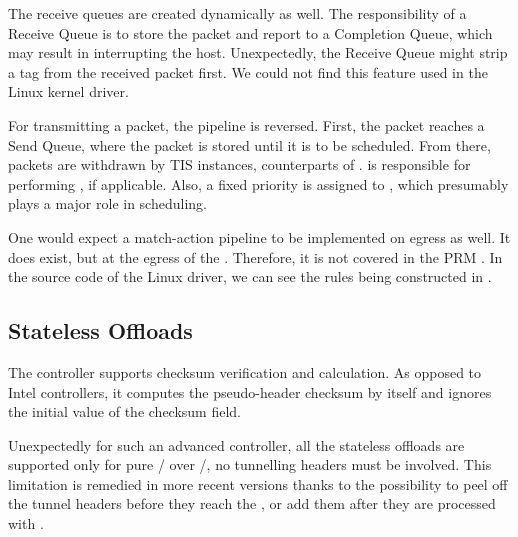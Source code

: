 The receive queues are created dynamically as well. The responsibility of a Receive
Queue is to store the packet and report to a Completion Queue, which may result
in interrupting the host. Unexpectedly, the Receive Queue might strip
a  tag from the received packet first. We could not find this
feature used in the Linux kernel driver.

For transmitting a packet, the pipeline is reversed. First, the packet reaches
a Send Queue, where the packet is stored until it is to be scheduled. From
there, packets are withdrawn by \acrfull{TIS} instances, counterparts of
.  is responsible for performing , if applicable. Also,
a fixed priority is assigned to , which presumably plays a major role in
scheduling.

One would expect a match-action pipeline to be implemented on egress as well.
It does exist, but at the egress of the . Therefore, it is not
covered in the PRM \cite{mlx-prm}. In the source code of the Linux driver, we
can see the rules being constructed in
.

\subsection{Stateless Offloads}

The controller supports checksum verification and calculation. As opposed to
Intel controllers, it computes the pseudo-header checksum by itself and ignores
the initial value of the checksum field.

Unexpectedly for such an advanced controller, all the stateless offloads are
supported only for pure / over /, no tunnelling
headers must be involved. This limitation is remedied in more recent versions
thanks to the possibility to peel off the tunnel headers before they reach the
, or add them after they are processed with .

